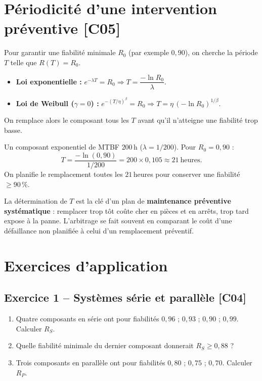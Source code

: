 \documentclass[a4paper,11pt]{article}
\begin{document}
\newpage
\section{Périodicité d'une intervention préventive \hfill {\normalsize\color{uimmred}[C05]}}

\begin{methode}
Pour garantir une fiabilité minimale $R_0$ (par exemple $0{,}90$), on cherche la période $T$ telle que $R(T) = R_0$.
\begin{itemize}
  \item \textbf{Loi exponentielle :} $e^{-\lambda T} = R_0 \Rightarrow T = \dfrac{-\ln R_0}{\lambda}$.
  \item \textbf{Loi de Weibull ($\gamma = 0$) :} $e^{-(T/\eta)^{\beta}} = R_0 \Rightarrow T = \eta\,\left(-\ln R_0\right)^{1/\beta}$.
\end{itemize}
On remplace alors le composant tous les $T$ avant qu'il n'atteigne une fiabilité trop basse.
\end{methode}

\begin{exemple}
Un composant exponentiel de MTBF $200$\,h ($\lambda = 1/200$). Pour $R_0 = 0{,}90$ :
\[
T = \frac{-\ln(0{,}90)}{1/200} = 200 \times 0{,}105 \approx 21\ \text{heures.}
\]
On planifie le remplacement toutes les $21$\,heures pour conserver une fiabilité $\geq 90\,\%$.
\end{exemple}

\begin{appliindus}
La détermination de $T$ est la clé d'un plan de \textbf{maintenance préventive systématique} : remplacer trop tôt coûte cher en pièces et en arrêts, trop tard expose à la panne. L'arbitrage se fait souvent en comparant le coût d'une défaillance non planifiée à celui d'un remplacement préventif.
\end{appliindus}

\newpage
\section{Exercices d'application}

\subsection*{Exercice 1 -- Systèmes série et parallèle \hfill {\normalsize\color{uimmred}[C04]}}
\begin{enumerate}[label=\alph*)]
  \item Quatre composants en série ont pour fiabilités $0{,}96$ ; $0{,}93$ ; $0{,}90$ ; $0{,}99$. Calculer $R_S$.
  \item Quelle fiabilité minimale du dernier composant donnerait $R_S \geq 0{,}88$ ?
  \item Trois composants en parallèle ont pour fiabilités $0{,}80$ ; $0{,}75$ ; $0{,}70$. Calculer $R_P$.
\end{enumerate}
\end{document}
